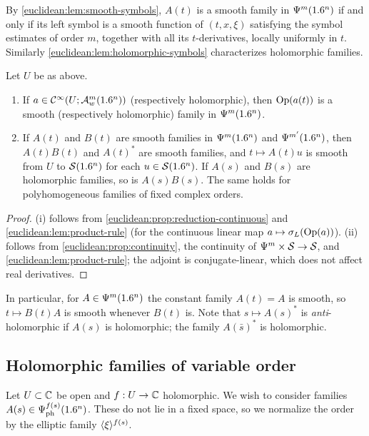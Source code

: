 By \cref{euclidean:lem:smooth-symbols}, $A(t)$ is a smooth family in
$\Psi^{m}(1.6^n)$ if and only if its left symbol is a smooth function of
$(t,x,\xi)$ satisfying the symbol estimates of order $m$, together with all
its $t$-derivatives, locally uniformly in $t$. Similarly
\cref{euclidean:lem:holomorphic-symbols} characterizes holomorphic families.

\begin{proposition}\label{euclidean:prop:smooth-families}
  Let $U$ be as above.
  \begin{enumerate}[label=\textup{(\roman*)}]
  \item If $a\in\mathcal{C}^\infty(U;\mathcal{A}^{m}_{w}(1.6^n))$ \textup{(}respectively holomorphic\textup{)},
    then $\operatorname{Op}(a(t))$ is a smooth \textup{(}respectively holomorphic\textup{)}
    family in $\Psi^{m}(1.6^n)$.
  \item If $A(t)$ and $B(t)$ are smooth families in $\Psi^{m}(1.6^n)$ and
    $\Psi^{m'}(1.6^n)$, then $A(t)B(t)$ and $A(t)^*$ are smooth families, and
    $t\mapsto A(t)u$ is smooth from $U$ to $\mathcal{S}(1.6^n)$ for each
    $u\in\mathcal{S}(1.6^n)$. If $A(s)$ and $B(s)$ are holomorphic families, so is
    $A(s)B(s)$. The same holds for polyhomogeneous families of fixed complex
    orders.
  \end{enumerate}
\end{proposition}
\begin{proof}
  (i) follows from \cref{euclidean:prop:reduction-continuous} and
  \cref{euclidean:lem:product-rule} (for the continuous linear map
  $a\mapsto\sigma_L(\operatorname{Op}(a))$). (ii) follows from
  \cref{euclidean:prop:continuity}, the continuity of
  $\Psi^{m}\times\mathcal{S}\to\mathcal{S}$, and \cref{euclidean:lem:product-rule}; the
  adjoint is conjugate-linear, which does not affect real derivatives.
\end{proof}

In particular, for $A\in\Psi^{m}(1.6^n)$ the constant family $A(t)=A$ is
smooth, so $t\mapsto B(t)A$ is smooth whenever $B(t)$ is. Note that
$s\mapsto A(s)^*$ is \emph{anti}-holomorphic if $A(s)$ is holomorphic; the
family $A(\bar s)^*$ is holomorphic.

\subsection{Holomorphic families of variable order}

Let $U\subset\mathbb{C}$ be open and $f:U\to\mathbb{C}$ holomorphic. We wish to consider
families $A(s)\in\Psi^{f(s)}_{\mathrm{ph}}(1.6^n)$. These do not lie in a
fixed space, so we normalize the order by the elliptic family
$\langle \xi\rangle^{f(s)}$.

